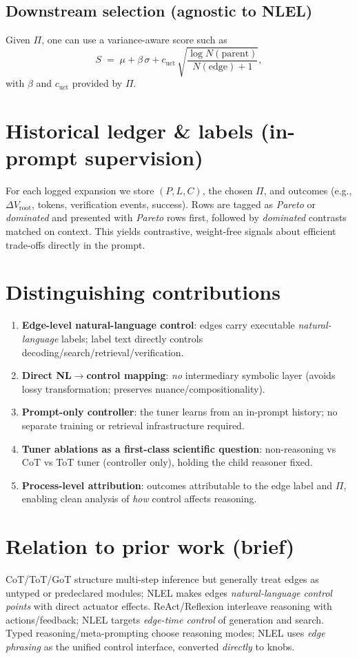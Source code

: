 \documentclass[11pt]{article}
\begin{document}
\subsection{Downstream selection (agnostic to NLEL)}
Given $\Pi$, one can use a variance-aware score such as
\[
S \;=\; \mu + \beta\,\sigma + c_{\text{uct}}\,\sqrt{\frac{\log N(\text{parent})}{N(\text{edge})+1}},
\]
with $\beta$ and $c_{\text{uct}}$ provided by $\Pi$.

\section{Historical ledger \& labels (in-prompt supervision)}
For each logged expansion we store $(P,L,C)$, the chosen $\Pi$, and outcomes (e.g., $\Delta V_{\text{root}}$, tokens, verification events, success). Rows are tagged as \emph{Pareto} or \emph{dominated} and presented with \emph{Pareto} rows first, followed by \emph{dominated} contrasts matched on context. This yields contrastive, weight-free signals about efficient trade-offs directly in the prompt.

\section{Distinguishing contributions}
\begin{enumerate}[leftmargin=1.2em]
  \item \textbf{Edge-level natural-language control}: edges carry executable \emph{natural-language} labels; label text directly controls decoding/search/retrieval/verification.
  \item \textbf{Direct NL$\to$control mapping}: \emph{no} intermediary symbolic layer (avoids lossy transformation; preserves nuance/compositionality).
  \item \textbf{Prompt-only controller}: the tuner learns from an in-prompt history; no separate training or retrieval infrastructure required.
  \item \textbf{Tuner ablations as a first-class scientific question}: non-reasoning vs CoT vs ToT tuner (controller only), holding the child reasoner fixed.
  \item \textbf{Process-level attribution}: outcomes attributable to the edge label and $\Pi$, enabling clean analysis of \emph{how} control affects reasoning.
\end{enumerate}

\section{Relation to prior work (brief)}
CoT/ToT/GoT structure multi-step inference but generally treat edges as untyped or predeclared modules; NLEL makes edges \emph{natural-language control points} with direct actuator effects. ReAct/Reflexion interleave reasoning with actions/feedback; NLEL targets \emph{edge-time control} of generation and search. Typed reasoning/meta-prompting choose reasoning modes; NLEL uses \emph{edge phrasing} as the unified control interface, converted \emph{directly} to knobs.
\end{document}
